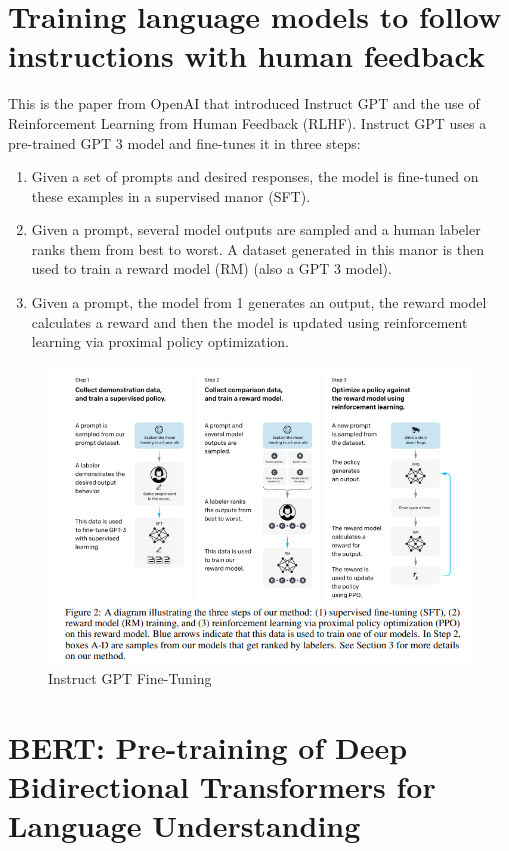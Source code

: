 \documentclass[11pt]{article}
\theoremstyle{definition}
\begin{document}
\section{Training language models to follow instructions with human feedback \cite{ouyang2022training}}

This is the paper from OpenAI that introduced Instruct GPT and the use of Reinforcement Learning from Human Feedback (RLHF). Instruct GPT uses a pre-trained GPT 3 model and fine-tunes it in three steps:
\begin{enumerate}
\item Given a set of prompts and desired responses, the model is fine-tuned on these examples in a supervised manor (SFT).
\item Given a prompt, several model outputs are sampled and a human labeler ranks them from best to worst. A dataset generated in this manor is then used to train a reward model (RM) (also a GPT 3 model).
\item Given a prompt, the model from 1 generates an output, the reward model calculates a reward and then the model is updated using reinforcement learning via proximal policy optimization.
\end{enumerate}

\begin{figure}
\centering
  \includegraphics[width=\textwidth,height=\textheight,keepaspectratio]{transformers/instructgpt.png}
  \caption{Instruct GPT Fine-Tuning \cite{ouyang2022training}}
  \label{fig:instructgpt}
\end{figure}

\section{BERT: Pre-training of Deep Bidirectional Transformers for Language Understanding}
\end{document}
